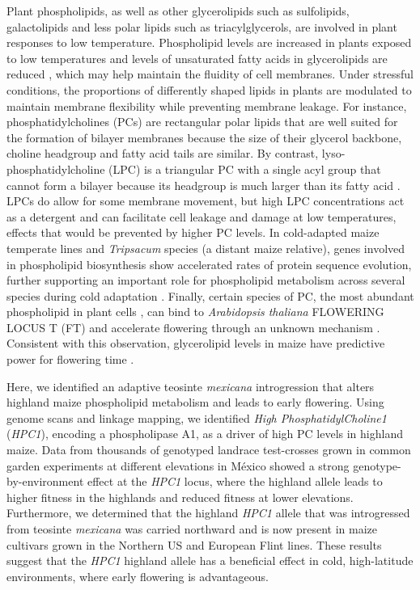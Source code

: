 \documentclass[9pt,twocolumn,twoside,lineno]{BioRxiv}
\begin{document}
Plant phospholipids, as well as other glycerolipids such as sulfolipids, galactolipids and less polar lipids such as triacylglycerols, are involved in plant responses to low temperature.
Phospholipid levels are increased in plants exposed to low temperatures \cite{Degenkolbe2012-wf} and levels of unsaturated fatty acids in glycerolipids are reduced \cite{Welti2002-uk, Lynch1987-ln}, which may help maintain the fluidity of cell membranes.
Under stressful conditions, the proportions of differently shaped lipids in plants are modulated to maintain membrane flexibility while preventing membrane leakage. 
For instance, phosphatidylcholines (PCs) are rectangular polar lipids that are well suited for the formation of bilayer membranes because the size of their glycerol backbone, choline headgroup and fatty acid tails are similar.
By contrast, lyso-phosphatidylcholine (LPC) is a triangular PC with a single acyl group that cannot form a bilayer because its headgroup is much larger than its fatty acid \cite{Jouhet2013-fv}.
LPCs do allow for some membrane movement, but high LPC concentrations act as a detergent \cite{Henriksen2010-cm} and can facilitate cell leakage and damage at low temperatures, effects that would be prevented by higher PC levels.
In cold-adapted maize temperate lines and \textit{Tripsacum} species (a distant maize relative), genes involved in  phospholipid biosynthesis show accelerated rates of protein sequence evolution, further supporting an important role for phospholipid metabolism across several species during cold adaptation \cite{Yan2019-tx}. 
Finally, certain species of PC, the most abundant phospholipid  in plant cells \cite{Gu2017-nd}, can bind to \textit{Arabidopsis thaliana} FLOWERING LOCUS T (FT) and accelerate flowering through an unknown mechanism \cite{Nakamura2014-qf}. 
Consistent with this observation, glycerolipid levels in maize have predictive power for flowering time \cite{Riedelsheimer2013-bd}. 

Here, we identified an adaptive teosinte \textit{mexicana} introgression that alters highland maize phospholipid metabolism and leads to early flowering.
Using genome scans and linkage mapping, we identified \textit{High PhosphatidylCholine1} (\textit{HPC1}), encoding a phospholipase A1, as a driver of high PC levels in highland maize. 
Data from thousands of genotyped landrace test-crosses grown in common garden experiments at different elevations in México showed a strong genotype-by-environment effect at the \textit{HPC1} locus, where the highland allele leads to higher fitness in the highlands and reduced fitness at lower elevations.
Furthermore, we determined that the highland \textit{HPC1} allele that was introgressed from teosinte \textit{mexicana} was carried northward and is now present in maize cultivars grown in the Northern US and European Flint lines.
These results suggest that the \textit{HPC1} highland allele has a beneficial effect in cold, high-latitude environments, where early flowering is advantageous.
\end{document}
